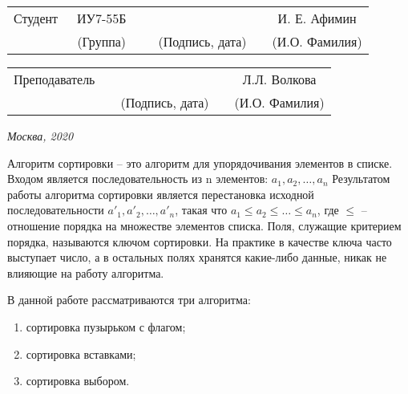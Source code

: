 \documentclass[utf8x, 12pt]{G7-32}
\begin{document}
\vspace{1.5cm}
\noindent
\begin{tabular}{l c c c c c}
    Студент      & ~ИУ7-55Б~               & \hspace{3.5cm} & \hspace{3.5cm}                 & &  И. Е. Афимин \\\cline{2-2}\cline{4-4} \cline{6-6} 
    \hspace{3cm} & {\footnotesize(Группа)} &                & {\footnotesize(Подпись, дата)} & & {\footnotesize(И.О. Фамилия)}
\end{tabular}

\vspace{1cm}

\noindent
\begin{tabular}{l c c c c}
    Преподаватель & \hspace{6cm}   & \hspace{3.5cm}                 & & Л.Л. Волкова \\\cline{3-3} \cline{5-5} 
    \hspace{3cm}  &                & {\footnotesize(Подпись, дата)} & & {\footnotesize(И.О. Фамилия)}
\end{tabular}

\begin{center}	
	\vfill
	\large \textit {Москва, 2020}
\end{center}

\thispagestyle {empty}
\pagebreak

\tableofcontents

\newpage
\Introduction    
    Алгоритм сортировки -- это алгоритм для упорядочивания элементов в списке.
    Входом является последовательность из n элементов: $ a_1, a_2, \dots, a_n $
    Результатом работы алгоритма сортировки является перестановка
    исходной последовательности $ a'_1, a'_2, \dots, a'_n $,
    такая что $ a_1 \leqslant a_2 \leqslant \dots \leqslant a_n $, 
    где $ \leqslant $ -- отношение порядка на множестве элементов списка.
    Поля, служащие критерием порядка, называются ключом сортировки.
    На практике в качестве ключа часто выступает число,
    а в остальных полях хранятся какие-либо данные, 
    никак не влияющие на работу алгоритма.
    
    В данной работе рассматриваются три алгоритма:
    \begin{enumerate}
        \item сортировка пузырьком с флагом;
        \item сортировка вставками;
        \item сортировка выбором.
    \end{enumerate}
\end{document}
